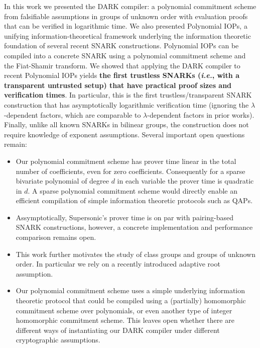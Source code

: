 In this work we presented the DARK compiler: a polynomial commitment scheme from falsifiable assumptions in groups of unknown order with evaluation proofs that can be verified in logarithmic time. We also presented Polynomial IOPs, a unifying information-theoretical framework underlying the information theoretic foundation of several recent SNARK constructions. Polynomial IOPs can be compiled into a concrete SNARK using a polynomial commitment scheme and the Fiat-Shamir transform. We showed that applying the DARK compiler to recent Polynomial IOPs yields \textbf{the first trustless SNARKs (\emph{i.e.}, with a transparent untrusted setup) that have practical proof sizes and verification times}. In particular, this is the first trustless/transparent SNARK construction that has asymptotically logarithmic verification time (ignoring the $\lambda$-dependent factors, which are comparable to $\lambda$-dependent factors in prior works). Finally, unlike all known SNARKs in bilinear groups, the construction does not require knowledge of exponent assumptions.
Several important open questions remain:

\begin{itemize}
    \item Our polynomial commitment scheme has prover time linear in the total number of coefficients, even for zero coefficients. Consequently for a sparse bivariate polynomial of degree $d$ in each variable the prover time is quadratic in $d$. A sparse polynomial commitment scheme would directly enable an efficient compilation of simple information theoretic protocols such as QAPs.
    \item Assymptotically, Supersonic's prover time is on par with pairing-based SNARK constructions, however, a concrete implementation and performance comparison remains open.
    \item This work further motivates the study of class groups and groups of unknown order. In particular we rely on a recently introduced adaptive root assumption.
    \item Our polynomial commitment scheme uses a simple underlying information theoretic protocol that could be compiled using a (partially) homomorphic commitment scheme over polynomials, or even another type of integer homomorphic commitment scheme. This leaves open whether there are different ways of instantiating our DARK compiler under different cryptographic assumptions. 
    
\end{itemize}


